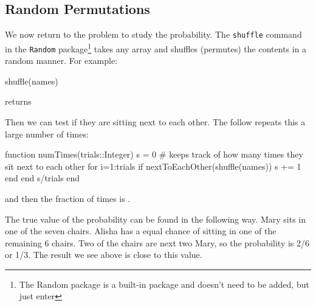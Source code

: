 \subsection{Random Permutations}

We now return to the problem to study the probability.  The \verb!shuffle! command in the \verb!Random! package\footnote{The Random package is a built-in package and doesn't need to be added, but just enter } takes any array and shuffles (permutes) the contents in a random manner.  For example:
\begin{jlblock}[prob]
shuffle(names)
\end{jlblock}
returns  \printpythontex[verbatim][frame=single]

Then we can test if they are sitting next to each other.  The follow repeats this a large number of times:

\begin{jlblock}[prob]
function numTimes(trials::Integer)
  s = 0  # keeps track of how many times they sit next to each other
  for i=1:trials
    if nextToEachOther(shuffle(names))
      s += 1
    end
  end
  s/trials
end
\end{jlblock}
and then the fraction of times is  \printpythontex[verb]. 

The true value of the probability can be found in the following way. Mary sits in one of the seven chairs.  Alisha has a equal chance of sitting in one of the remaining 6 chairs.  Two of the chairs are next two Mary, so the probability is 2/6 or 1/3.  The result we see above is close to this value. 


